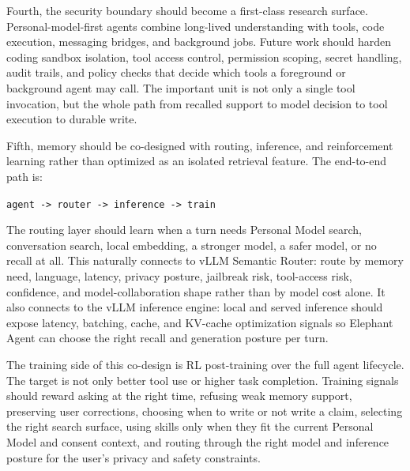 Fourth, the security boundary should become a first-class research surface.
Personal-model-first agents combine long-lived understanding with tools, code
execution, messaging bridges, and background jobs. Future work should harden
coding sandbox isolation, tool access control, permission scoping, secret
handling, audit trails, and policy checks that decide which tools a foreground
or background agent may call. The important unit is not only a single tool
invocation, but the whole path from recalled support to model decision to tool
execution to durable write.

Fifth, memory should be co-designed with routing, inference, and reinforcement
learning rather than optimized as an isolated retrieval feature. The end-to-end
path is:

\begin{center}
\texttt{agent -> router -> inference -> train}
\end{center}

The routing layer should learn when a turn needs Personal Model search,
conversation search, local embedding, a stronger model, a safer model, or no
recall at all. This naturally connects to vLLM Semantic Router: route by memory
need, language, latency, privacy posture, jailbreak risk, tool-access risk,
confidence, and model-collaboration shape rather than by model cost alone. It
also connects to the vLLM inference engine: local and served inference should
expose latency, batching, cache, and KV-cache optimization signals so Elephant
Agent can choose the right recall and generation posture per turn.

The training side of this co-design is RL post-training over the full agent
lifecycle. The target is not only better tool use or higher task completion.
Training signals should reward asking at the right time, refusing weak memory
support, preserving user corrections, choosing when to write or not write a
claim, selecting the right search surface, using skills only when they fit the
current Personal Model and consent context, and routing through the right model
and inference posture for the user's privacy and safety constraints.
